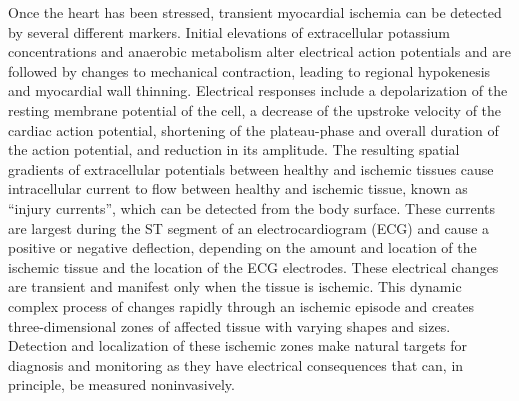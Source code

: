 Once the heart has been stressed, transient myocardial ischemia can be
detected by several different markers. Initial elevations of extracellular
potassium concentrations and anaerobic metabolism alter electrical action
potentials and are followed by changes to mechanical contraction, leading to
regional hypokenesis and myocardial wall
thinning.\cite{BLZ:Mai1994,RSM:Rei86b} Electrical responses include a
depolarization of the resting membrane potential of the cell, a decrease of
the upstroke velocity of the cardiac action potential, shortening of the
plateau-phase and overall duration of the action potential, and reduction
in its amplitude. \cite{BLZ:Yan1996,BMB:Kat2011} The resulting spatial
gradients of extracellular potentials between healthy and ischemic tissues
cause intracellular current to flow between healthy and ischemic tissue,
known as ``injury currents'', which can be detected from the body
surface.\cite{KKA:Sha97a,KKA:Sha97b,RSM:Bra76,RSM:Bra88} These currents are
largest during the ST segment of an electrocardiogram (ECG) and cause a
positive or negative deflection, depending on the amount and location of
the ischemic tissue and the location of the ECG electrodes.
\cite{BLZ:Jan1980,BLZ:Jan1981} These electrical changes are transient and
manifest only when the tissue is ischemic. This dynamic complex process of
changes rapidly through an ischemic episode and creates three-dimensional
zones of affected tissue with varying shapes and sizes.  Detection and
localization of these ischemic zones make natural targets for diagnosis and
monitoring as they have electrical consequences that can, in principle, be
measured noninvasively. 

